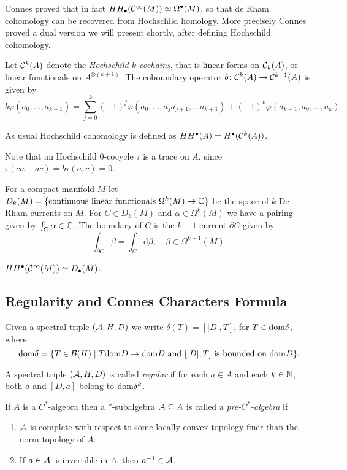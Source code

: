 \noindent Connes proved that in fact $HH_\bullet(\mathcal{C}^\infty(M))\simeq\Omega^\bullet(M)$, so that de Rham cohomology can be recovered from Hochschild homology. More precisely Connes proved a dual version we will present shortly, after defining Hochschild cohomology.

\begin{definition}
 Let $\mathcal{C}^k(A)$ denote the \emph{Hochschild $k$-cochains}, that is linear forms on $\mathcal{C}_k(A)$, or linear functionals on $A^{\otimes(k+1)}$. The coboundary operator $b\colon\mathcal{C}^k(A)\to\mathcal{C}^{k+1}(A)$ is given by 
 $$b\varphi(a_0,\ldots,a_{k+1})=\sum_{j=0}^k(-1)^j\varphi(a_0,\ldots,a_ja_{j+1},\ldots a_{k+1})+(-1)^k\varphi(a_{k-1},a_0,\ldots,a_k).$$
 
 \noindent As usual Hochschild cohomology is defined as $HH^\bullet(A)=H^\bullet(\mathcal{C}^k(A))$.
\end{definition}

\noindent Note that an Hochschild $0$-cocycle $\tau$ is a trace on $A$, since $\tau(ca-ac)=b\tau(a,c)=0$.

\begin{definition}
 For a compact manifold $M$ let $D_k(M)=\{\text{continuous linear functionals }\Omega^k(M)\to\mathbb{C}\}$ be the space of $k$-De Rham currents on $M$. For $C\in D_k(M)$ and $\alpha\in\Omega^k(M)$ we have a pairing given by $\int_C\alpha\in\mathbb{C}$. The boundary of $C$ is the $k-1$ current $\partial C$ given by $$\int_{\partial C}\beta=\int_C\mathrm{d}\beta,\quad\beta\in\Omega^{k-1}(M).$$
\end{definition}

\begin{theorem}[Connes]
 $HH^\bullet(\mathcal{C}^\infty(M))\simeq D_\bullet(M)$.
\end{theorem}

\subsection{Regularity and Connes Characters Formula}
Given a spectral triple $(\mathcal{A},H,D)$ we write $\delta(T)=[|D|,T]$, for $T\in\mathrm{dom}\delta$, where 
$$\mathrm{dom}\delta=\{T\in\mathcal{B}(H)\mid T\mathrm{dom} D\to\mathrm{dom} D\text{ and } [|D|,T]\text{ is bounded on }\mathrm{dom} D\}.$$

\begin{definition}
 A spectral triple $(\mathcal{A},H,D)$ is called \emph{regular} if for each $a\in A$ and each $k\in\mathbb{N}$, both $a$ and $[D,a]$ belong to $\mathrm{dom}\delta^k$.
\end{definition}

\begin{definition}
 If $A$ is a $C^\ast$-algebra then a $\ast$-subalgebra $\mathcal{A}\subseteq A$ is called a \emph{pre-$C^\ast$-algebra} if
 \begin{enumerate}
  \item $\mathcal{A}$ is complete with respect to some locally convex topology finer than the norm topology of $A$.
  \item If $a\in\mathcal{A}$ is invertible in $A$, then $a^{-1}\in\mathcal{A}$.
 \end{enumerate}
\end{definition}

